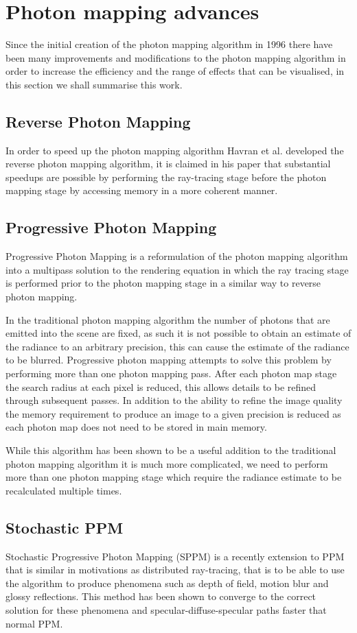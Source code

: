 \section{Photon mapping advances}
Since the initial creation of the photon mapping algorithm in 1996 there have been many improvements
and modifications to the photon mapping algorithm in order to increase the efficiency and the
range of effects that can be visualised, in this section we shall summarise this work.

\subsection{Reverse Photon Mapping}
In order to speed up the photon mapping algorithm Havran et al. developed the reverse photon mapping
algorithm, it is claimed in his paper that substantial speedups are possible by performing the
ray-tracing stage before the photon mapping stage by accessing memory in a more coherent manner.

\subsection{Progressive Photon Mapping}
Progressive Photon Mapping \cite{Hachisuka08} is a reformulation of the photon mapping algorithm
into a multipass solution to the rendering equation in which the ray tracing stage is performed prior
to the photon mapping stage in a similar way to reverse photon mapping.

In the traditional photon mapping algorithm the number of photons that are emitted into the scene
are fixed, as such it is not possible to obtain an estimate of the radiance to an arbitrary
precision, this can cause the estimate of the radiance to be blurred. Progressive photon mapping
attempts to solve this problem by performing more than one photon mapping pass. After each photon
map stage the search radius at each pixel is reduced, this allows details to be refined through
subsequent passes. In addition to the ability to refine the image quality the memory requirement to
produce an image to a given precision is reduced as each photon map does not need to be stored in
main memory.

While this algorithm has been shown to be a useful addition to the traditional photon mapping
algorithm it is much more complicated, we need to perform more than one photon mapping stage which
require the radiance estimate to be recalculated multiple times.

\subsection{Stochastic PPM}
Stochastic Progressive Photon Mapping (SPPM) \cite{Hachisuka09} is a recently extension to PPM that
is similar in motivations as distributed ray-tracing, that is to be able to use the algorithm to
produce phenomena such as depth of field, motion blur and glossy reflections. This method has been
shown to converge to the correct solution for these phenomena and specular-diffuse-specular paths
faster that normal PPM.

